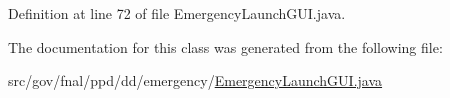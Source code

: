 Definition at line 72 of file Emergency\-Launch\-G\-U\-I.\-java.



The documentation for this class was generated from the following file\-:\begin{DoxyCompactItemize}
\item 
src/gov/fnal/ppd/dd/emergency/\hyperlink{EmergencyLaunchGUI_8java}{Emergency\-Launch\-G\-U\-I.\-java}\end{DoxyCompactItemize}
